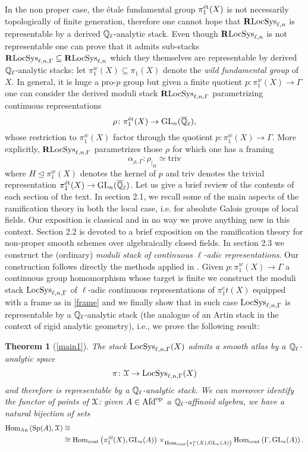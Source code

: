 \documentclass[10pt,a4paper]{amsart}
\numberwithin{equation}{subsection}
\theoremstyle{plain}
\newtheorem{theorem}{Theorem}[section]
\theoremstyle{definition}
\theoremstyle{remark}
\numberwithin{equation}{section}
\begin{document}
In the non proper case, the \'etale fundamental group $\pi_1^{\text{\'et}}(X)$ is not necessarily topologically of finite generation, therefore one cannot hope that $\mathbf R \mathrm{LocSys}_{\ell, n}$ is representable by a derived $\mathbb{Q}_\ell$-analytic stack. Even though $\mathbf R \mathrm{LocSys}_{\ell, n}$ is not
representable one can prove that it admits sub-stacks $\mathbf R \mathrm{LocSys}_{\ell, n, \Gamma} \subseteq \mathbf R \mathrm{LocSys}_{\ell, n}$ which they themselves are representable by derived $\mathbb{Q}_\ell$-analytic stacks: let $\pi_1^w (X) \subseteq \pi_1(X)$ denote the \emph{wild fundamental group} of $X$.
In general, it is huge a pro-$p$ group but given a finite quotient $p \colon \pi_1^w(X) \to \Gamma$ one can consider the derived moduli stack $\mathbf R \mathrm{LocSys}_{\ell, n, \Gamma}$ parametrizing continuous representations
	\[
		\rho \colon \pi_1^{\text{\'et}}(X) \to \mathrm{GL}_n(\overline{\mathbb{Q}}_\ell),
	\]
whose restriction to $\pi_1^w(X)$ factor through the quotient $p \colon \pi_1 ^w(X) \to \Gamma$. More explicitly, $\mathbf R \mathrm{LocSys}_{\ell, n, \Gamma}$ parametrizes those $\rho$ for which one has a framing 
	\begin{equation} \label{frame}
		\alpha_{\rho, \Gamma} \colon \rho_{|_H} \simeq \mathrm{triv}
	\end{equation}
where $H \unlhd \pi_1^w(X)$ denotes the kernel of $p$ and $\mathrm{triv}$ denotes the trivial representation $\pi_1^{\text{\'et}}(X) \to \mathrm{GL}_n(\overline{\mathbb{Q}}_\ell)$. Let us give a brief review of the contents of each section of the text.
In section 2.1, we recall some of the main aspects of the ramification theory in both the local case, i.e. for absolute Galois groups of local fields. Our exposition is classical and in no way we prove anything
new in this context. Section 2.2 is devoted to a brief exposition on the ramification theory for non-proper smooth schemes over algebraically closed fields. 
In section 2.3
we construct the (ordinary) \emph{moduli stack of continuous $\ell$-adic representations}. Our construction follows directly the methods applied in \cite{me1}. Given $p \colon \pi_1^w(X) \to \Gamma$ a continuous group
homomorphism whose target is finite we construct the moduli stack $\mathrm{LocSys}_{\ell, n, \Gamma}$ of $\ell$-adic continuous representations of $\pi_1^et(X)$ equipped with a frame as in \eqref{frame} and we finally show that in such case $\mathrm{LocSys}_{\ell, n, \Gamma}$ is representable
by a $\mathbb{Q}_\ell$-analytic stack (the analogue of an Artin stack in the context of rigid analytic geometry), i.e., we prove the following result:

\begin{theorem}[\cref{main1}]
The stack $\mathrm{LocSys}_{\ell, n, \Gamma}(X)$ admits a smooth atlas by a $\mathbb{Q}_\ell$-analytic space 
	\[
		\pi \colon \mathcal X \to \mathrm{LocSys}_{\ell, n, \Gamma}(X)
	\]
and therefore is representable by a $\mathbb{Q}_{\ell}$-analytic stack. We can moreover identify the functor of points of $\mathcal X$: given $A \in \mathrm{Afd}^{\mathrm{op}}$ a
$\mathbb{Q}_\ell$-affinoid algebra, we have a natural bijection of sets
	\begin{align}
		\mathrm{Hom}_{\mathrm{An}} \left( \operatorname{Sp} (A), \mathcal X \right) & \cong \\
		& \cong \mathrm{Hom}_{\mathrm{cont}} \left( \pi_1^\emph{\text{\'et}}(X), \mathrm{GL}_n(A) \right) \times_{ 		\mathrm{Hom}_{\mathrm{cont}} \left( \pi_1^w(X), \mathrm{GL}_n(A) \right) 		} 		\mathrm{Hom}_{\mathrm{cont}} \left( \Gamma, \mathrm{GL}_n(A) \right).
	\end{align}
\end{theorem}
\end{document}
